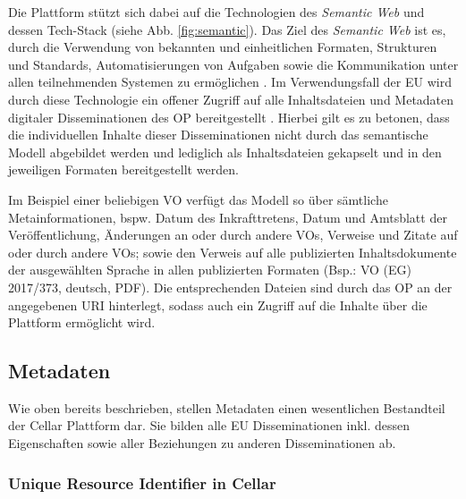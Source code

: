     \medskip
    Die Plattform stützt sich dabei auf die Technologien des \textit{Semantic Web} und dessen Tech-Stack (siehe Abb. \ref{fig:semantic}).
    Das Ziel des \textit{Semantic Web} ist es, durch die Verwendung von bekannten und einheitlichen Formaten, Strukturen und Standards, Automatisierungen von Aufgaben sowie die Kommunikation unter allen teilnehmenden Systemen zu ermöglichen \cite[10]{eu_cellar}.   
    Im Verwendungsfall der \ac{EU} wird durch diese Technologie ein offener Zugriff auf alle Inhaltsdateien und Metadaten digitaler Disseminationen des \ac{OP} bereitgestellt \cite[7]{eu_cellar}.
    Hierbei gilt es zu betonen, dass die individuellen Inhalte dieser Disseminationen nicht durch das semantische Modell abgebildet werden und lediglich als Inhaltsdateien gekapselt und in den jeweiligen Formaten bereitgestellt werden.
    
    \medskip
    Im Beispiel einer beliebigen \acf{VO} verfügt das Modell so über sämtliche Metainformationen, bspw. Datum des Inkrafttretens, Datum und Amtsblatt der Veröffentlichung, Änderungen an oder durch andere \acp{VO}, Verweise und Zitate auf oder durch andere \acp{VO}; sowie den Verweis auf alle publizierten Inhaltsdokumente der ausgewählten Sprache in allen publizierten Formaten
    (Bsp.: \ac{VO} (\acs{EG}) 2017/373, deutsch, PDF).
    Die entsprechenden Dateien sind durch das \acl{OP} an der angegebenen \ac{URI} hinterlegt, sodass auch ein Zugriff auf die Inhalte über die Plattform ermöglicht wird.  

\subsection{Metadaten}
\label{ch:eu_meta}

    Wie oben bereits beschrieben, stellen Metadaten einen wesentlichen Bestandteil der Cellar Plattform dar.
    Sie bilden alle \ac{EU} Disseminationen inkl. dessen Eigenschaften sowie aller Beziehungen zu anderen Disseminationen ab. 
    
\subsubsection{Unique Resource Identifier in Cellar} \label{cellar_uri}

